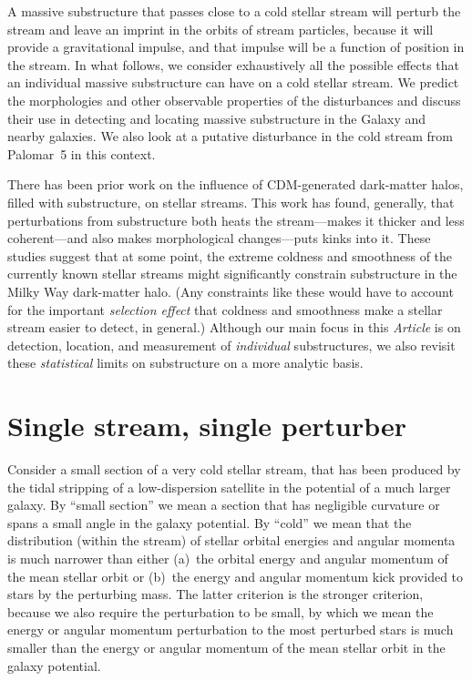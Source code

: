 \documentclass[12pt,preprint]{aastex}
\begin{document}
A massive substructure that passes close to a cold stellar stream will
perturb the stream and leave an imprint in the orbits of stream
particles, because it will provide a gravitational impulse, and that
impulse will be a function of position in the stream.  In what
follows, we consider exhaustively all the possible effects that an
individual massive substructure can have on a cold stellar stream.  We
predict the morphologies and other observable properties of the
disturbances and discuss their use in detecting and locating massive
substructure in the Galaxy and nearby galaxies.  We also look at a
putative disturbance in the cold stream from Palomar~5 in this
context.

There has been prior work on the influence of CDM-generated
dark-matter halos, filled with substructure, on stellar streams.  This
work has found, generally, that perturbations from substructure both
heats the stream---makes it thicker and less coherent---and also makes
morphological changes---puts kinks into it.  These studies suggest
that at some point, the extreme coldness and smoothness of the
currently known stellar streams might significantly constrain
substructure in the Milky Way dark-matter halo.  (Any constraints like
these would have to account for the important \emph{selection effect}
that coldness and
smoothness make a stellar stream easier to detect, in general.)
Although our main focus in this \textsl{Article}
is on detection, location, and measurement of
\emph{individual} substructures, we also revisit these
\emph{statistical} limits on substructure on a more analytic basis.

\section{Single stream, single perturber}

Consider a small section of a very cold stellar stream, that has been
produced by the tidal stripping of a low-dispersion satellite in the
potential of a much larger galaxy.  By ``small section'' we mean a
section that has negligible curvature or spans a small angle in the
galaxy potential.  By ``cold'' we mean that the distribution (within
the stream) of stellar orbital energies and angular momenta is much
narrower than either (a)~the orbital energy and angular momentum of
the mean stellar orbit or (b)~the energy and angular momentum kick
provided to stars by the perturbing mass.  The latter criterion is the
stronger criterion, because we also require the perturbation to be
small, by which we mean the energy or angular momentum perturbation to
the most perturbed stars is much smaller than the energy or angular
momentum of the mean stellar orbit in the galaxy potential.
\end{document}
